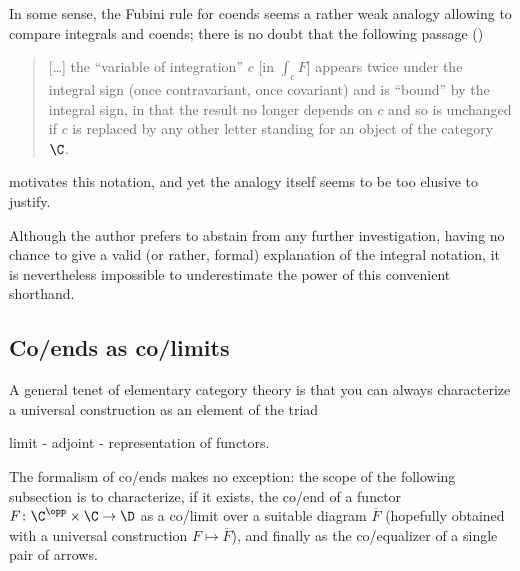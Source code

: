 \begin{remark}
In some sense, the Fubini rule for coends seems a rather weak analogy allowing to compare integrals and coends; there is no doubt that the following passage (\cite[\textbf{IX.5}]{McL})
\begin{quote}
[\dots] the ``variable of integration'' $c$ [in $\int_c F$] appears twice under the integral sign (once contravariant, once covariant) and is ``bound'' by the integral sign, in that the result no longer depends on $c$ and so is unchanged if $c$ is replaced by any other letter standing for an object of the category $\C$.
\end{quote}
motivates this notation, and yet the analogy itself seems to be too elusive to justify.%

Although the author prefers to abstain from any further investigation, having no chance to give a valid (or rather, formal) explanation of the integral notation, it is nevertheless impossible to underestimate the power of this convenient shorthand.
\end{remark}
\subsection{Co/ends as co/limits}\label{coends.as.colims}
A general tenet of elementary category theory is that you can always characterize a universal construction as an element of the triad 
\begin{center}
limit - adjoint - representation of functors. 
\end{center}
The formalism of co/ends makes no exception: the scope of the following subsection is to characterize, if it exists, the co/end of a functor $F\colon \C^\opp\times\C\to \D$ as a co/limit over a suitable diagram $\overline F$ (hopefully obtained with a universal construction $F\mapsto \overline F$), and finally as the co/equalizer of a single pair of arrows.

